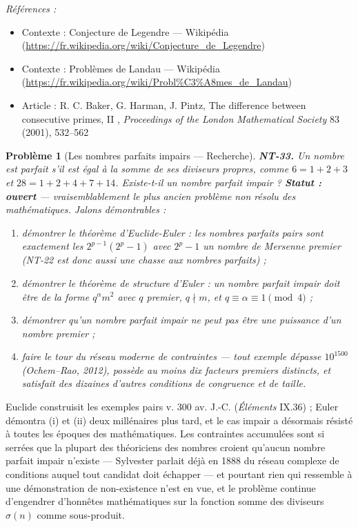 \documentclass[11pt]{article}
\newtheorem{problem}{Problème}
\newenvironment{refs}{\par\small\noindent\emph{Références :}\begin{itemize}\setlength\itemsep{0pt}}{\end{itemize}\normalsize}
\begin{document}
\begin{refs}
\item Contexte : Conjecture de Legendre --- Wikipédia (\url{https://fr.wikipedia.org/wiki/Conjecture_de_Legendre})
\item Contexte : Problèmes de Landau --- Wikipédia (\url{https://fr.wikipedia.org/wiki/Probl%C3%A8mes_de_Landau})
\item Article : R. C. Baker, G. Harman, J. Pintz, \og{} The difference between consecutive primes, II \fg{}, \textit{Proceedings of the London Mathematical Society} 83 (2001), 532--562
\end{refs}

\bigskip

\begin{problem}[{Les nombres parfaits impairs --- Recherche}]
\textbf{NT-33.} Un nombre est parfait s'il est égal à la somme de ses
diviseurs propres, comme $6 = 1 + 2 + 3$ et $28 = 1 + 2 + 4 + 7 + 14$. Existe-t-il un nombre
parfait \textit{impair} ? \textbf{Statut : ouvert} --- vraisemblablement le plus ancien problème non résolu
des mathématiques. Jalons démontrables :
\begin{enumerate}
\item[(i)] démontrer le théorème d'Euclide-Euler : les
nombres parfaits pairs sont exactement les $2^{p-1}(2^p - 1)$ avec $2^p - 1$ un nombre de
Mersenne premier (NT-22 est donc aussi une chasse aux nombres parfaits) ;
\item[(ii)] démontrer le théorème de structure d'Euler : un
nombre parfait impair doit être de la forme $q^{\alpha} m^2$ avec $q$ premier,
$q \nmid m$, et $q \equiv \alpha \equiv 1 \pmod 4$ ;
\item[(iii)] démontrer qu'un nombre
parfait impair ne peut pas être une puissance d'un nombre premier ;
\item[(iv)] faire le tour du réseau moderne de contraintes ---
tout exemple dépasse $10^{1500}$ (Ochem--Rao, 2012), possède au moins dix facteurs premiers
distincts, et satisfait des dizaines d'autres conditions de congruence et de taille.
\end{enumerate}

\end{problem}

\noindent Euclide construisit les exemples pairs v. 300 av. J.-C. (\textit{Éléments} IX.36) ;
Euler démontra (i) et (ii) deux millénaires plus tard, et le cas impair a désormais résisté à
toutes les époques des mathématiques. Les contraintes accumulées sont si serrées que la plupart des
théoriciens des nombres croient qu'aucun nombre parfait impair n'existe --- Sylvester parlait déjà en
1888 du \og{} réseau complexe de conditions \fg{} auquel tout candidat doit échapper --- et pourtant rien qui
ressemble à une démonstration de non-existence n'est en vue, et le problème continue d'engendrer
d'honnêtes mathématiques sur la fonction somme des diviseurs $\sigma(n)$ comme sous-produit.
\end{document}
